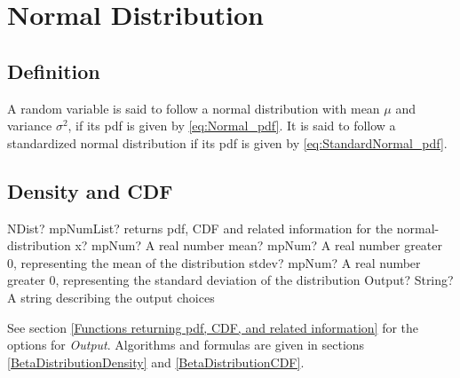 \section{Normal Distribution}
\label{sec:NormalDistribution}


\subsection{Definition}
\label{sec:NormalDistributionDefinition}
A random variable is said to follow a normal distribution with  mean $\mu$ and variance $\sigma^2$, if its pdf is given by \ref{eq:Normal_pdf}. It is said to follow a  standardized normal distribution if its pdf is given by \ref{eq:StandardNormal_pdf}.


\subsection{Density and CDF}

\begin{mpFunctionsExtract}
	\mpFunctionFour
	{NDist? mpNumList? returns pdf, CDF and related information for the normal-distribution}
	{x? mpNum? A real number}
	{mean? mpNum? A real number greater 0, representing the mean of the distribution}
	{stdev? mpNum? A real number greater 0, representing the standard deviation of the distribution}
	{Output? String? A string describing the output choices}
\end{mpFunctionsExtract}


\vspace{0.3cm}
See section \ref{Functions returning pdf, CDF, and related information} for the options for {\itshape\sffamily Output}. Algorithms and formulas are given in sections \ref{BetaDistributionDensity} and \ref{BetaDistributionCDF}.


%
%
%


